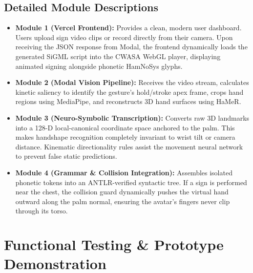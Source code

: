 \documentclass[11pt, a4paper]{article}
\begin{document}
\subsection{Detailed Module Descriptions}
\begin{itemize}[noitemsep, topsep=2pt]
    \item \textbf{Module 1 (Vercel Frontend):} Provides a clean, modern user dashboard. Users upload sign video clips or record directly from their camera. Upon receiving the JSON response from Modal, the frontend dynamically loads the generated SiGML script into the CWASA WebGL player, displaying animated signing alongside phonetic HamNoSys glyphs.
    \item \textbf{Module 2 (Modal Vision Pipeline):} Receives the video stream, calculates kinetic saliency to identify the gesture's hold/stroke apex frame, crops hand regions using MediaPipe, and reconstructs 3D hand surfaces using HaMeR.
    \item \textbf{Module 3 (Neuro-Symbolic Transcription):} Converts raw 3D landmarks into a 128-D local-canonical coordinate space anchored to the palm. This makes handshape recognition completely invariant to wrist tilt or camera distance. Kinematic directionality rules assist the movement neural network to prevent false static predictions.
    \item \textbf{Module 4 (Grammar \& Collision Integration):} Assembles isolated phonetic tokens into an ANTLR-verified syntactic tree. If a sign is performed near the chest, the collision guard dynamically pushes the virtual hand outward along the palm normal, ensuring the avatar's fingers never clip through its torso.
\end{itemize}

\section{Functional Testing \& Prototype Demonstration}
\end{document}

